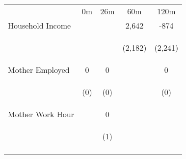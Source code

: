 \begin{tabular}{lcccc}
\hline \noalign{\smallskip} & 0m & 26m & 60m & 120m\\
\noalign{\smallskip}\hline \noalign{\smallskip}Household Income &  &  & 2,642 & -874\\
 & \begin{footnotesize}\end{footnotesize} & \begin{footnotesize}\end{footnotesize} & \begin{footnotesize}(2,182)\end{footnotesize} & \begin{footnotesize}(2,241)\end{footnotesize}\\
\noalign{\smallskip}Mother Employed & 0 & 0 &  & 0\\
 & \begin{footnotesize}(0)\end{footnotesize} & \begin{footnotesize}(0)\end{footnotesize} & \begin{footnotesize}\end{footnotesize} & \begin{footnotesize}(0)\end{footnotesize}\\
\noalign{\smallskip}Mother Work Hour &  & 0 &  & \\
 & \begin{footnotesize}\end{footnotesize} & \begin{footnotesize}(1)\end{footnotesize} & \begin{footnotesize}\end{footnotesize} & \begin{footnotesize}\end{footnotesize}\\
\noalign{\smallskip}\hline\end{tabular}\\
